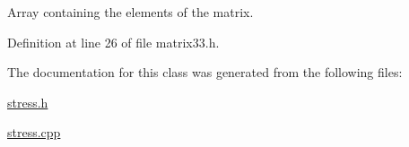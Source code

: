 \-Array containing the elements of the matrix. 



\-Definition at line 26 of file matrix33.\-h.



\-The documentation for this class was generated from the following files\-:\begin{DoxyCompactItemize}
\item 
\hyperlink{stress_8h}{stress.\-h}\item 
\hyperlink{stress_8cpp}{stress.\-cpp}\end{DoxyCompactItemize}
